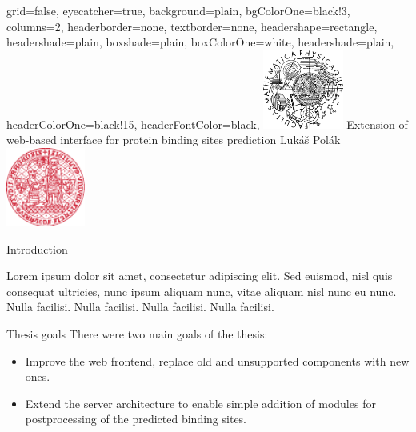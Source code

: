 \documentclass[portrait,a0paper,fontscale=0.25]{baposter}
\begin{document}
\color{black!80} %
\begin{poster}{grid=false,
	eyecatcher=true,
	background=plain,
	bgColorOne=black!3, %
	columns=2,
	headerborder=none,
	textborder=none,
	headershape=rectangle,
	headershade=plain,
	boxshade=plain,
	boxColorOne=white,
	headershade=plain,
	headerColorOne=black!15, %
	headerFontColor=black,
	}%
	{\includegraphics[height=7em]{logos/mff-black.pdf}}
	{Extension of web-based interface for protein binding sites prediction}
	{\vspace{1ex} Lukáš Polák}
	{\includegraphics[height=7em]{logos/uk-red.pdf}}


%
%

\begin{posterbox}[column=0,name=intro]{Introduction}

Lorem ipsum dolor sit amet, consectetur adipiscing elit. Sed euismod, nisl quis
consequat ultricies, nunc ipsum aliquam nunc, vitae aliquam nisl nunc eu
nunc. Nulla facilisi. Nulla facilisi. Nulla facilisi. Nulla facilisi.

\begin{center}\end{center}
\end{posterbox}

\begin{posterbox}[column=0, name=goals, below=intro, headerColorOne=cyan!60, boxColorOne=cyan!20]{Thesis goals}
There were two main goals of the thesis:
\begin{itemize}
\item Improve the web frontend, replace old and unsupported components with new ones.
\item Extend the server architecture to enable simple addition of modules for postprocessing of the predicted
binding sites.
\end{itemize}
\end{posterbox}


\end{poster}
\end{document}
